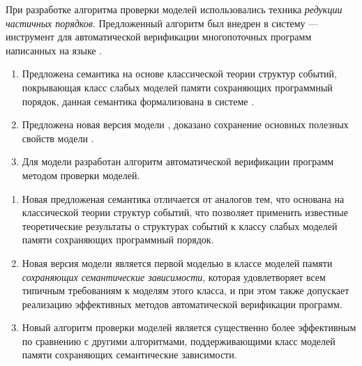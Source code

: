 При разработке алгоритма проверки моделей использовались техника \emph{редукции частичных порядков}.
Предложенный алгоритм был внедрен в систему \genmc --- 
инструмент для автоматической верификации многопоточных программ написанных на языке \CLANG.

{}
\begin{enumerate}[beginpenalty=10000] %
  \item Предложена семантика на основе классической теории структур событий, 
    покрывающая класс слабых моделей памяти сохраняющих программный порядок,
    данная семантика формализована в системе \coq.
  \item Предложена новая версия модели \WkmS, 
    доказано сохранение основных полезных свойств модели \Wkm.
  \item Для модели \WkmS разработан алгоритм автоматической 
    верификации программ методом проверки моделей.
\end{enumerate}

{\novelty}
\begin{enumerate}[beginpenalty=10000] %

  \item Новая предложеная семантика отличается от аналогов тем, 
    что основана на классической теории структур событий, 
    что позволяет применить известные теоретические результаты 
    о структурах событий к классу слабых моделей памяти сохраняющих программный порядок.

  \item Новая версия модели \WkmS является первой моделью в классе 
    моделей памяти \emph{сохраняющих семантические зависимости}, 
    которая удовлетворяет всем типичным требованиям к моделям этого класса, 
    и при этом также допускает реализацию эффективных методов автоматической верификации программ. 

  \item Новый алгоритм проверки моделей является существенно более эффективным 
    по сравнению с другими алгоритмами, поддерживающими 
    класс моделей памяти сохраняющих семантические зависимости.

\end{enumerate}

